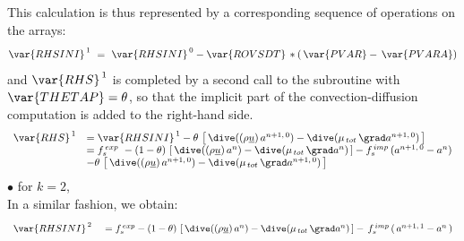 \begin{itemize}
This calculation is thus represented by a corresponding sequence of operations on the arrays:
\begin{equation}\notag
\var{RHSINI}^{\,1}\ =\ \var{RHSINI}^{\,0} - \var{ROVSDT}\,*(\,\var{PVAR}-\,\var{PVARA})
\end{equation}
and $\var{RHS}^{\,1}$ is completed by a second call to the subroutine  with $\var{THETAP}=\theta$, so that the implicit part of the convection-diffusion computation is added to the right-hand side.
\begin{equation}\notag
\begin{array}{ll}
\var{RHS}^{\,1} & = \var{RHSINI}^{\,1} -\theta\,\left[\,\dive((\rho \underline{u})\,a^{n+1,\,0}) - \dive(\mu_{\,tot}\,\grad a^{n+1,\,0})\,\right]\\
& = f_s^{\,exp}\ - (1-\theta)\,\left[\,\dive((\rho \underline{u})\,a^{n}) - \dive(\mu_{\,tot}\,\grad a^{n})\,\right]- f_s^{\,imp}\,(a^{n+1,\,0} -a^{n}) \\
& -\theta\,\left[\,\dive((\rho \underline{u})\,a^{n+1,\,0}) - \dive(\mu_{\,tot}\,\grad a^{n+1,\,0})\,\right]\\
\end{array}
\end{equation}
$\bullet$ for $k = 2$,\\
In a similar fashion, we obtain:
\begin{equation}\notag
\begin{array}{ll}
\var{RHSINI}^{\,2}\ &=f_s^{\,exp}-(1-\theta)\,\left[\,\dive((\rho \underline{u})\,a^n) - \dive(\mu_{\,tot}\,\grad a^n)\,\right]-\,f_s^{\,imp}\,(\,a^{n+1,\,1} - a^n\,)\\
\end{array}
\end{equation}


\end{itemize}
